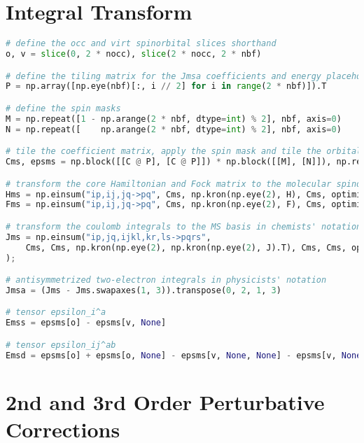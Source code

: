\section*{\texorpdfstring{Integral Transform\label{sec:int_code_solution}}{Integral Transform}}

\raggedbottom\begin{lstlisting}[language=Python, caption={Integral transform exercise code solution.}, label=code:int_solution]
# define the occ and virt spinorbital slices shorthand
o, v = slice(0, 2 * nocc), slice(2 * nocc, 2 * nbf)

# define the tiling matrix for the Jmsa coefficients and energy placeholders
P = np.array([np.eye(nbf)[:, i // 2] for i in range(2 * nbf)]).T

# define the spin masks
M = np.repeat([1 - np.arange(2 * nbf, dtype=int) % 2], nbf, axis=0)
N = np.repeat([    np.arange(2 * nbf, dtype=int) % 2], nbf, axis=0)

# tile the coefficient matrix, apply the spin mask and tile the orbital energies
Cms, epsms = np.block([[C @ P], [C @ P]]) * np.block([[M], [N]]), np.repeat(eps, 2)

# transform the core Hamiltonian and Fock matrix to the molecular spinorbital basis
Hms = np.einsum("ip,ij,jq->pq", Cms, np.kron(np.eye(2), H), Cms, optimize=True)
Fms = np.einsum("ip,ij,jq->pq", Cms, np.kron(np.eye(2), F), Cms, optimize=True)

# transform the coulomb integrals to the MS basis in chemists' notation
Jms = np.einsum("ip,jq,ijkl,kr,ls->pqrs",
    Cms, Cms, np.kron(np.eye(2), np.kron(np.eye(2), J).T), Cms, Cms, optimize=True
);

# antisymmetrized two-electron integrals in physicists' notation
Jmsa = (Jms - Jms.swapaxes(1, 3)).transpose(0, 2, 1, 3)

# tensor epsilon_i^a
Emss = epsms[o] - epsms[v, None]

# tensor epsilon_ij^ab
Emsd = epsms[o] + epsms[o, None] - epsms[v, None, None] - epsms[v, None, None, None]
\end{lstlisting}

\section*{\texorpdfstring{2nd and 3rd Order Perturbative Corrections\label{sec:mp_code_solution}}{2nd and 3rd Order Perturbative Corrections}}

